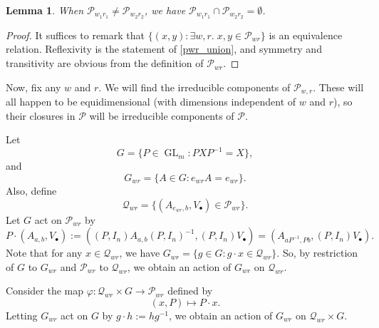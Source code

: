 \documentclass[12pt,psamsfonts]{article}
\DeclareMathOperator{\GL}{GL}
\newtheorem{lemma}[theorem]{Lemma}
\begin{document}
\begin{lemma}
    When \(\mathcal{P}_{w_1r_1} \neq \mathcal{P}_{w_2r_2}\), we have \(\mathcal{P}_{w_1r_1} \cap \mathcal{P}_{w_2r_2} = \emptyset\). 
\end{lemma}
\begin{proof}
    It suffices to remark that \(\{(x,y) : \exists w,r. \; x,y \in \mathcal{P}_{wr}\}\) is an equivalence relation.
    Reflexivity is the statement of \cref{pwr_union}, and symmetry and transitivity are obvious from the definition of \(\mathcal{P}_{wr}\).
\end{proof}

Now, fix any \(w\) and \(r\).
We will find the irreducible components of \(\mathcal{P}_{w,r}\).
These will all happen to be equidimensional (with dimensions independent of \(w\) and \(r\)), so their closures in \(\mathcal{P}\) will be irreducible components of \(\mathcal{P}\).
\par Let 
\[G = \{P \in \GL_m : P X P^{-1} = X\},\]
and
\[G_{wr} = \{A \in G : e_{wr}A = e_{wr}\}.\]
Also, define 
\[\mathcal{Q}_{wr} = \{(A_{e_{wr}, b}, V_\bullet) \in \mathcal{P}_{wr}\}.\]
Let \(G\) act on \(\mathcal{P}_{wr}\) by
\[P \cdot (A_{a,b}, V_\bullet) := ((P, I_n) A_{a, b} (P, I_n)^{-1}, (P, I_n)V_\bullet) = (A_{a P^{-1}, Pb}, (P, I_n) V_\bullet).\]
Note that for any \(x \in \mathcal{Q}_{wr}\), we have \(G_{wr} = \{g \in G : g \cdot x \in \mathcal{Q}_{wr}\}\).
So, by restriction of \(G\) to \(G_{wr}\) and \(\mathcal{P}_{wr}\) to \(\mathcal{Q}_{wr}\), we obtain an action of \(G_{wr}\) on \(\mathcal{Q}_{wr}\).
\par Consider the map \(\varphi : \mathcal{Q}_{wr} \times G \to \mathcal{P}_{wr}\) defined by
\[(x, P) \mapsto P \cdot x.\]
Letting \(G_{wr}\) act on \(G\) by \(g \cdot h := hg^{-1}\), we obtain an action of \(G_{wr}\) on \(\mathcal{Q}_{wr} \times G\).
\end{document}
